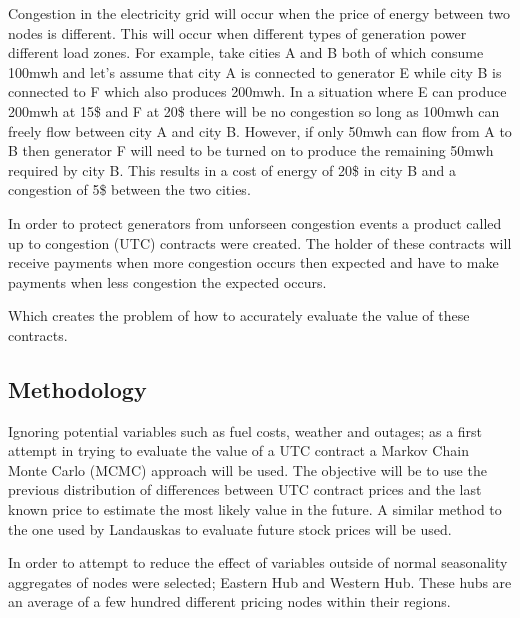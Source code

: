 \documentclass{report}
\begin{document}
Congestion in the electricity grid will occur when the price of energy between
two nodes is different. This will occur when different types of generation power
different load zones. For example, take cities A and B both of which consume
100mwh and let's assume that city A is connected to generator E while city B is connected to
 F which also produces 200mwh. In a situation where E can produce 200mwh at
15\$ and F at 20\$ there will be no congestion so long as 100mwh can freely flow
between city A and city B. However, if only 50mwh can flow
from A to B then generator F will need to be turned on to produce the remaining
50mwh required by city B. This results in a cost of energy
of 20\$ in city B and a congestion of 5\$ between the two cities.

In order to protect generators from unforseen congestion events a product called
up to congestion (UTC) contracts were created. The holder of these contracts will
receive payments when more congestion occurs then expected and have to make payments
when less congestion the expected occurs.

Which creates the problem of how to accurately evaluate the value of these contracts.

\subsection*{Methodology}
Ignoring potential variables such as fuel costs, weather and outages; as a first
attempt in trying to evaluate the value of a UTC contract a Markov
Chain Monte Carlo (MCMC) approach will be used. The objective will be to use the
previous distribution of differences between UTC contract prices and the last
known price to estimate the most likely value in the future. A similar method to
the one used by Landauskas \cite{landauskas} to evaluate future stock prices will
be used.

In order to attempt to reduce the effect of variables outside of normal seasonality
aggregates of nodes were selected; Eastern Hub and Western Hub. These hubs are an average
of a few hundred different pricing nodes within their regions.
\end{document}
